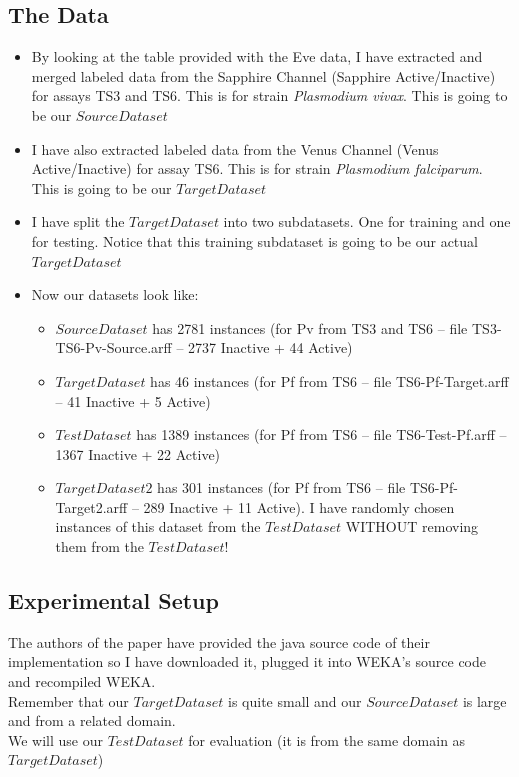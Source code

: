 \documentclass[a4paper,12pt, english]{article}
\begin{document}
\subsection{The Data}
\begin{itemize}
\item By looking at the table provided with the Eve data, I have extracted and merged labeled data from the Sapphire Channel (Sapphire Active/Inactive) for assays TS3 and TS6. This is for strain \emph{Plasmodium vivax}. This is going to be our $Source Dataset$

\item I have also extracted labeled data from the Venus Channel (Venus Active/Inactive) for assay TS6. This is for strain \emph{Plasmodium falciparum}. This is going to be our $Target Dataset$
\item I have split the $Target Dataset$ into two subdatasets. One for training and one for testing. Notice that this training subdataset is going to be our actual $Target Dataset$
\item Now our datasets look like:
   \begin{itemize}
	\item $Source Dataset$ has 2781 instances (for Pv from TS3 and TS6 -- file TS3-TS6-Pv-Source.arff -- 2737 Inactive + 44 Active)
	\item $Target Dataset$ has 46 instances (for Pf from TS6 -- file TS6-Pf-Target.arff -- 41 Inactive + 5 Active)
	\item $Test Dataset$ has 1389 instances (for Pf from TS6 -- file TS6-Test-Pf.arff -- 1367 Inactive + 22 Active)
	\item $Target Dataset2$ has 301 instances (for Pf from TS6 -- file TS6-Pf-Target2.arff -- 289 Inactive + 11 Active). I have randomly chosen instances of this dataset from the $Test Dataset$ WITHOUT removing them from the $Test Dataset$!
   \end{itemize}  
\end{itemize}  

\subsection{Experimental Setup}
The authors of the paper have provided the java source code of their implementation so I have downloaded it, plugged it into WEKA's source code and recompiled WEKA.\\
Remember that our $Target Dataset$ is quite small and our $Source Dataset$ is large and from a related domain.\\
We will use our $Test Dataset$ for evaluation (it is from the same domain as $Target Dataset$)\\
\end{document}
